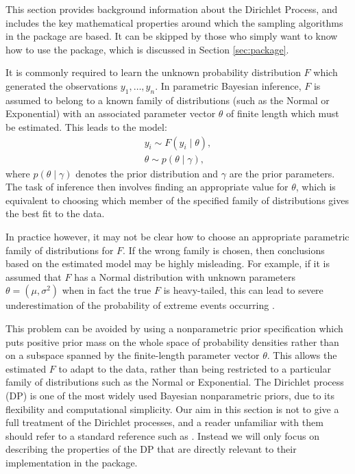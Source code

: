 \documentclass[nojss]{jss}
\begin{document}
This section provides background information about the Dirichlet Process, and includes the key mathematical properties around which the sampling algorithms in the  package are based. It can be skipped by those who simply want to know how to use the package, which is discussed in Section  \ref{sec:package}.


It is commonly required to learn the unknown probability distribution $F$ which generated the observations $y_1,\ldots,y_n$. In parametric Bayesian inference, $F$ is assumed to belong to a known family of distributions (such as the Normal or Exponential) with an associated parameter vector $\theta$ of finite length  which must be estimated. This leads to the model:
\begin{align*}
y_i \sim F(y_i \mid \theta), \\
\theta \sim p(\theta \mid \gamma),
\end{align*}
where $p(\theta \mid \gamma)$ denotes the prior distribution and $\gamma$ are the prior parameters. The task of inference then involves finding an appropriate value for $\theta$, which is equivalent to choosing which member of the specified family of distributions gives the best fit to the data.

In practice however, it may not be clear how to choose an appropriate parametric family of distributions for $F$. If the wrong family is chosen, then conclusions based on the estimated model may be highly misleading. For example, if it is assumed that $F$ has a Normal distribution with unknown parameters $\theta=(\mu,\sigma^2)$ when in fact the true $F$ is heavy-tailed, this can lead to severe underestimation of the probability of extreme events occurring \citep{coles_introduction_2001}.

This problem can be avoided by using a nonparametric prior specification which puts positive prior mass on the whole space of probability densities rather than on a subspace spanned by the finite-length parameter vector $\theta$. This allows the estimated $F$ to adapt to the data, rather than being restricted to a particular family of distributions such as the Normal or Exponential. The Dirichlet process (DP) is one of the most widely used Bayesian nonparametric priors, due to its flexibility and computational simplicity. Our aim in this section is not to give a full treatment of the Dirichlet processes, and a reader unfamiliar with them should refer to a standard reference such as \cite{escobar_bayesian_1995}. Instead we will only focus on describing the properties of the DP that are directly relevant to their implementation in the  package.
\end{document}
